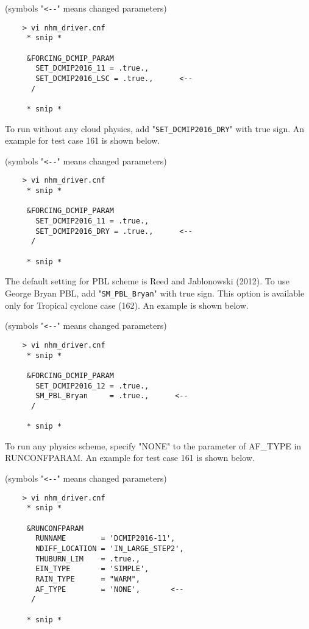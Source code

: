 \documentclass[a4paper]{article}
\begin{document}
 (symbols "\verb|<--|" means changed parameters)
 \begin{verbatim}
    > vi nhm_driver.cnf
     * snip *

     &FORCING_DCMIP_PARAM
       SET_DCMIP2016_11 = .true.,
       SET_DCMIP2016_LSC = .true.,      <--
      /

     * snip *
 \end{verbatim}



 \noindent To run without any cloud physics, add "\verb|SET_DCMIP2016_DRY|" with true sign.
 An example for test case 161 is shown below.

 (symbols "\verb|<--|" means changed parameters)
 \begin{verbatim}
    > vi nhm_driver.cnf
     * snip *

     &FORCING_DCMIP_PARAM
       SET_DCMIP2016_11 = .true.,
       SET_DCMIP2016_DRY = .true.,      <--
      /

     * snip *
 \end{verbatim}



 \noindent The default setting for PBL scheme is Reed and Jablonowski (2012).
 To use George Bryan PBL, add "\verb|SM_PBL_Bryan|" with true sign.
 This option is available only for Tropical cyclone case (162).
 An example is shown below.

 (symbols "\verb|<--|" means changed parameters)
 \begin{verbatim}
    > vi nhm_driver.cnf
     * snip *

     &FORCING_DCMIP_PARAM
       SET_DCMIP2016_12 = .true.,
       SM_PBL_Bryan     = .true.,      <--
      /

     * snip *
 \end{verbatim}



 \noindent To run any physics scheme, specify "NONE" to the parameter
 of AF\_TYPE in RUNCONFPARAM.
 An example for test case 161 is shown below.

 (symbols "\verb|<--|" means changed parameters)
 \begin{verbatim}
    > vi nhm_driver.cnf
     * snip *

     &RUNCONFPARAM
       RUNNAME        = 'DCMIP2016-11',
       NDIFF_LOCATION = 'IN_LARGE_STEP2',
       THUBURN_LIM    = .true.,
       EIN_TYPE       = 'SIMPLE',
       RAIN_TYPE      = "WARM",
       AF_TYPE        = 'NONE',       <--
      /

     * snip *
 \end{verbatim}
\end{document}

